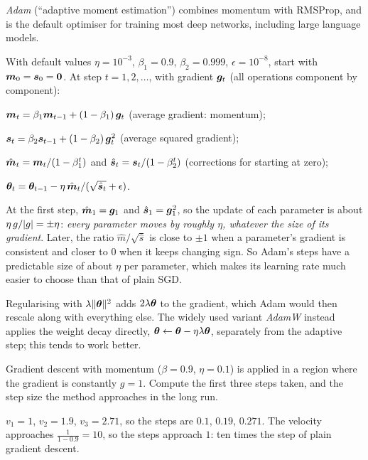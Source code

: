 \emph{Adam} (``adaptive moment estimation'') combines momentum with RMSProp, and
is the default optimiser for training most deep networks, including large
language models.

\begin{algorithm}[Adam]\label{alg:adam}
With default values $\eta = 10^{-3}$, $\beta_1 = 0.9$, $\beta_2 = 0.999$,
$\epsilon = 10^{-8}$, start with $\bm{m}_0 = \bm{s}_0 = \bm{0}$. At step
$t = 1, 2, \dots$, with gradient $\bm{g}_t$ (all operations component by component):
\begin{steps}
  \item $\bm{m}_t = \beta_1\bm{m}_{t-1} + (1 - \beta_1)\,\bm{g}_t$ \quad (average gradient:
    momentum);
  \item $\bm{s}_t = \beta_2\bm{s}_{t-1} + (1 - \beta_2)\,\bm{g}_t^2$ \quad (average squared
    gradient);
  \item $\hat{\bm{m}}_t = \bm{m}_t/(1 - \beta_1^t)$ and $\hat{\bm{s}}_t = \bm{s}_t/(1 - \beta_2^t)$
    \quad (corrections for starting at zero);
  \item $\bm{\theta}_t = \bm{\theta}_{t-1} - \eta\,\hat{\bm{m}}_t/(\sqrt{\hat{\bm{s}}_t} + \epsilon)$.
\end{steps}
\end{algorithm}

\begin{intuition}
At the first step, $\hat{\bm{m}}_1 = \bm{g}_1$ and $\hat{\bm{s}}_1 = \bm{g}_1^2$, so the update of
each parameter is about $\eta\,g/\lvert g\rvert = \pm\eta$: \emph{every parameter moves by
roughly $\eta$, whatever the size of its gradient}. Later, the ratio
$\hat m/\sqrt{\hat s}$ is close to $\pm1$ when a parameter's gradient is consistent
and closer to $0$ when it keeps changing sign. So Adam's steps have a
predictable size of about $\eta$ per parameter, which makes its learning rate
much easier to choose than that of plain SGD.
\end{intuition}

\begin{remark}[AdamW]
Regularising with $\lambda\lVert\bm{\theta}\rVert^2$ adds $2\lambda\bm{\theta}$ to the gradient,
which Adam would then rescale along with everything else. The widely used variant
\emph{AdamW} instead applies the weight decay directly,
$\bm{\theta} \leftarrow \bm{\theta} - \eta\lambda\bm{\theta}$, separately from the adaptive
step; this tends to work better.
\end{remark}

\sectionexercises

\begin{exercise}
Gradient descent with momentum ($\beta = 0.9$, $\eta = 0.1$) is applied in a
region where the gradient is constantly $g = 1$. Compute the first three steps
taken, and the step size the method approaches in the long run.
\end{exercise}
\begin{solution}
$v_1 = 1$, $v_2 = 1.9$, $v_3 = 2.71$, so the steps are $0.1$, $0.19$, $0.271$. The
velocity approaches $\tfrac{1}{1 - 0.9} = 10$, so the steps approach $1$: ten times
the step of plain gradient descent.
\end{solution}

